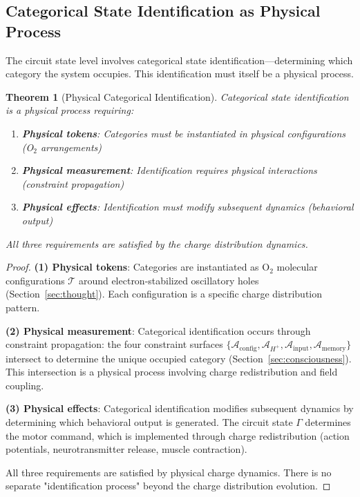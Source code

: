 \documentclass[aps,prd,twocolumn,superscriptaddress,floatfix,nofootinbib]{revtex4-2}
\newtheorem{theorem}{Theorem}[section]
\theoremstyle{remark}
\begin{document}
\subsection{Categorical State Identification as Physical Process}

The circuit state level involves categorical state identification—determining which category the system occupies. This identification must itself be a physical process.

\begin{theorem}[Physical Categorical Identification]
\label{thm:physical_identification}
Categorical state identification is a physical process requiring:
\begin{enumerate}
\item \textbf{Physical tokens}: Categories must be instantiated in physical configurations (O$_2$ arrangements)
\item \textbf{Physical measurement}: Identification requires physical interactions (constraint propagation)
\item \textbf{Physical effects}: Identification must modify subsequent dynamics (behavioral output)
\end{enumerate}
All three requirements are satisfied by the charge distribution dynamics.
\end{theorem}

\begin{proof}
\textbf{(1) Physical tokens}: Categories are instantiated as O$_2$ molecular configurations $\mathcal{T}$ around electron-stabilized oscillatory holes (Section~\ref{sec:thought}). Each configuration is a specific charge distribution pattern.

\textbf{(2) Physical measurement}: Categorical identification occurs through constraint propagation: the four constraint surfaces $\{\mathcal{A}_{\text{config}}, \mathcal{A}_{H^+}, \mathcal{A}_{\text{input}}, \mathcal{A}_{\text{memory}}\}$ intersect to determine the unique occupied category (Section~\ref{sec:consciousness}). This intersection is a physical process involving charge redistribution and field coupling.

\textbf{(3) Physical effects}: Categorical identification modifies subsequent dynamics by determining which behavioral output is generated. The circuit state $\Gamma$ determines the motor command, which is implemented through charge redistribution (action potentials, neurotransmitter release, muscle contraction).

All three requirements are satisfied by physical charge dynamics. There is no separate "identification process" beyond the charge distribution evolution.
\end{proof}
\end{document}
